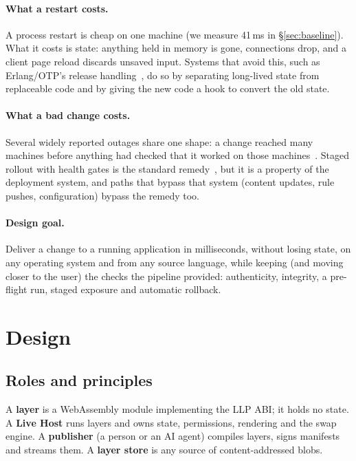 \documentclass[10pt,twocolumn]{article}
\newcommand{\ms}{\,ms\xspace}
\begin{document}
\paragraph{What a restart costs.} A process restart is cheap on one machine (we measure 41\ms in
\S\ref{sec:baseline}). What it costs is state: anything held in memory is gone, connections drop,
and a client page reload discards unsaved input. Systems that avoid this, such as Erlang/OTP's
release handling~\cite{armstrong2003}, do so by separating long-lived state from replaceable code
and by giving the new code a hook to convert the old state.

\paragraph{What a bad change costs.} Several widely reported outages share one shape: a change
reached many machines before anything had checked that it worked on those
machines~\cite{crowdstrike2024rca,cloudflare2019,fastly2021,sec2013knight}. Staged rollout with
health gates is the standard remedy~\cite{li2020gandalf,tang2015config}, but it is a property of
the deployment system, and paths that bypass that system (content updates, rule pushes,
configuration) bypass the remedy too.

\paragraph{Design goal.} Deliver a change to a running application in milliseconds, without
losing state, on any operating system and from any source language, while keeping (and moving
closer to the user) the checks the pipeline provided: authenticity, integrity, a pre-flight run,
staged exposure and automatic rollback.

\section{Design}
\label{sec:design}

\subsection{Roles and principles}

A \textbf{layer} is a WebAssembly module implementing the LLP ABI; it holds no state. A
\textbf{Live Host} runs layers and owns state, permissions, rendering and the swap engine. A
\textbf{publisher} (a person or an AI agent) compiles layers, signs manifests and streams them. A
\textbf{layer store} is any source of content-addressed blobs.
\end{document}
